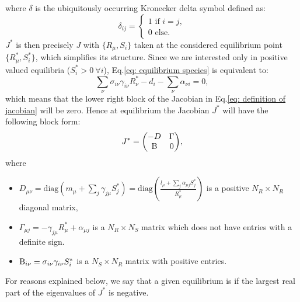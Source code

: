 \documentclass[12pt, titlepage]{report}
\begin{document}
where $\delta$ is the ubiquitously occurring Kronecker delta symbol defined as:
\begin{equation}
\delta_{ij} =
\begin{cases}
1 \text{ if }i=j, \\
0 \text{ else.}
\end{cases}
\end{equation}
$J^*$ is then precisely $J$  with $\{R_\mu, S_i\}$ taken at the considered equilibrium point $\{R_\mu^*, S_i^*\}$, which simplifies its structure.
Since we are interested only in positive valued equilibria (\ie $S^*_i > 0 \ \forall i$), Eq.\eqref{eq: equilibrium species} is equivalent to:
\begin{equation}
  \sum_\nu \sigma_{i\nu} \gamma_{i\nu}R^*_\nu -d_i - \sum_\nu \alpha_{\nu i} = 0,
\end{equation}
which means that the lower right block of the Jacobian in Eq.\eqref{eq: definition of jacobian} will be zero. Hence at equilibrium the Jacobian $J^*$ will have the following block form:
\begin{equation}
{
  J^* = \begin{pmatrix}
  -D & \Gamma \\
  \text{B}& 0
\end{pmatrix}
}, \label{eq: jacobian at equilibrium}
\end{equation}
where
\begin{itemize}
  \item $D_{\mu\nu} = \text{diag}(m_\mu+\sum_j \gamma_{j\mu} S^*_j) = \text{diag}\left(\frac{l_\mu + \sum_j \alpha_{\mu j}S_j^*}{R^*_\mu}\right)$ is a positive $N_R \times N_R$ diagonal matrix,
  \item $\Gamma_{\mu j} = -\gamma_{j\mu}R^*_\mu + \alpha_{\mu j}$ is a $N_R \times N_S$ matrix which does not have entries with a definite sign.
  \item $\text{B}_{i\nu} = \sigma_{i\nu} \gamma_{i\nu} S^*_i$ is a $N_S \times N_R$ matrix with positive entries.
\end{itemize}
For reasons explained below, we say that a given equilibrium is  if the largest real part of the eigenvalues of $J^*$ is negative.
\end{document}
